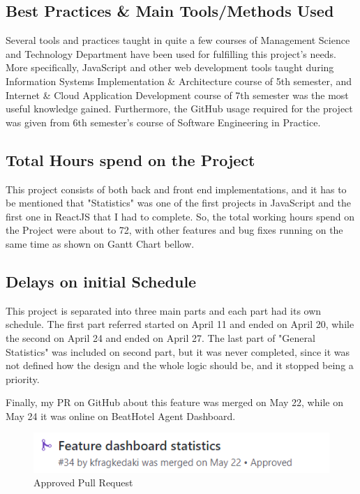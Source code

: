 \subsection{Best Practices \& Main Tools/Methods Used}

Several tools and practices taught in quite a few courses of Management Science and Technology Department have been used for fulfilling this project's needs. More specifically, JavaScript and other web development tools taught during Information Systems Implementation \& Architecture course of 5th semester, and Internet \& Cloud Application Development course of 7th semester was the most useful knowledge gained. Furthermore, the GitHub usage required for the project was given from 6th semester's course of Software Engineering in Practice.

\subsection{Total Hours spend on the Project}

This project consists of both back and front end implementations, and it has to be mentioned that "Statistics" was one of the first projects in JavaScript and the first one in ReactJS that I had to complete. So, the total working hours spend on the Project were about to 72, with other features and bug fixes running on the same time as shown on Gantt Chart bellow.

\subsection{Delays on initial Schedule}

This project is separated into three main parts and each part had its own schedule. The first part referred started on April 11 and ended on April 20, while the second on April 24 and ended on April 27. The last part of "General Statistics" was included on second part, but it was never completed, since it was not defined how the design and the whole logic should be, and it stopped being a priority. \par

Finally, my PR on GitHub about this feature was merged on May 22, while on May 24 it was online on BeatHotel Agent Dashboard.

\begin{figure}[H]
	\begin{center}
		\includegraphics[scale=0.85]{images/my_projects/Statistics/feature-dashboard-statistics-PR.png}
	\end{center}
	\caption{Approved Pull Request}
\end{figure}


